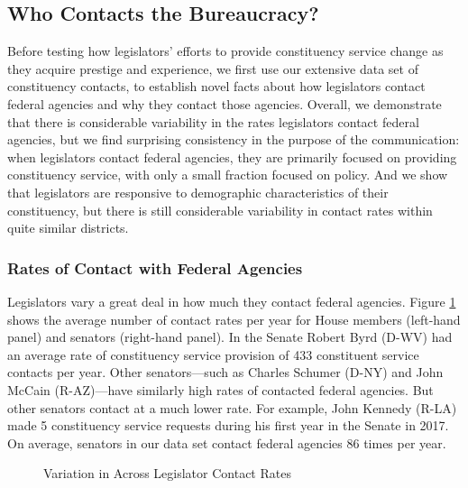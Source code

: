 \documentclass[12pt]{article}
\begin{document}
\subsection{Who Contacts the Bureaucracy?}
Before testing how legislators' efforts to provide constituency service change as they acquire prestige and experience, we first use our extensive data set of constituency contacts, to establish novel facts about how legislators contact federal agencies and why they contact those agencies. Overall, we demonstrate that there is considerable variability in the rates legislators contact federal agencies, but we find surprising consistency in the purpose of the communication: when legislators contact federal agencies, they are primarily focused on providing constituency service, with only a small fraction focused on policy. And we show that legislators are responsive to demographic characteristics of their constituency, but there is still considerable variability in contact rates within quite similar districts.  

\subsubsection{Rates of Contact with Federal Agencies}
Legislators vary a great deal in how much they contact federal agencies. Figure \ref{f:contact1} shows the average number of contact rates per year for House members (left-hand panel) and senators (right-hand panel). In the Senate Robert Byrd (D-WV) had an average rate of constituency service provision of 433 constituent service contacts per year. Other senators---such as Charles Schumer (D-NY) and John McCain (R-AZ)---have similarly high rates of contacted federal agencies. But other senators contact at a much lower rate. For example, John Kennedy (R-LA) made 5 constituency service requests during his first year in the Senate in 2017. On average, senators in our data set contact federal agencies 86 times per year.   
 
\begin{figure}
\centering
\caption{Variation in Across Legislator Contact Rates} \label{f:contact1} 
\begin{minipage}{\textwidth}
\end{minipage}
\end{figure}
\end{document}
